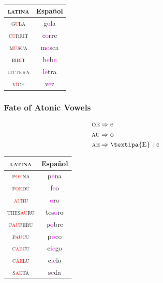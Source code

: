 \documentclass{report}[12pt]
\begin{document}
\begin{tabular}{c c}
  \textsc{latina} & Español \\
  \hline
  \textsc{g\textcolor{red}{u}la} & g\textcolor{magenta}{o}la \\
  \textsc{c\textcolor{red}{u}rrit} & c\textcolor{magenta}{o}rre \\
  \textsc{m\textcolor{red}{\u{u}}sca} & m\textcolor{magenta}{o}sca \\
  \textsc{b\textcolor{red}{i}b\textcolor{red}{i}t} & b\textcolor{magenta}{e}b\textcolor{magenta}{e} \\
  \textsc{l\textcolor{red}{i}ttera} & l\textcolor{magenta}{e}tra \\
  \textsc{v\textcolor{red}{\u{i}}ce} & v\textcolor{magenta}{e}z \\
\end{tabular}

\subsubsection{Fate of Atonic Vowels}

\begin{tcolorbox}[title=Monophthongization]
  \begin{align*}
    \textsc{oe} & \Rightarrow \text{e} \\
    \textsc{au} & \Rightarrow \text{o} \\
    \textsc{ae} & \Rightarrow \text{\textipa{E}}\ |\ \text{e} \\
  \end{align*}
\end{tcolorbox}

\begin{tabular}{c c}
  \textsc{latina} & Español \\
  \hline
  \textsc{p\textcolor{red}{oe}na} & p\textcolor{magenta}{e}na \\
  \textsc{f\textcolor{red}{oe}du} & f\textcolor{magenta}{e}o \\
  \textsc{\textcolor{red}{au}ru} & \textcolor{magenta}{o}ro \\
  \textsc{thes\textcolor{red}{au}ru} & tes\textcolor{magenta}{o}ro \\
  \textsc{p\textcolor{red}{au}peru} & p\textcolor{magenta}{o}bre \\
  \textsc{p\textcolor{red}{au}cu} & p\textcolor{magenta}{o}co \\
  \textsc{c\textcolor{red}{ae}cu} & c\textcolor{magenta}{ie}go \\
  \textsc{c\textcolor{red}{ae}lu} & c\textcolor{magenta}{ie}lo \\
  \textsc{s\textcolor{red}{ae}ta} & s\textcolor{magenta}{e}da \\
\end{tabular}
\end{document}
